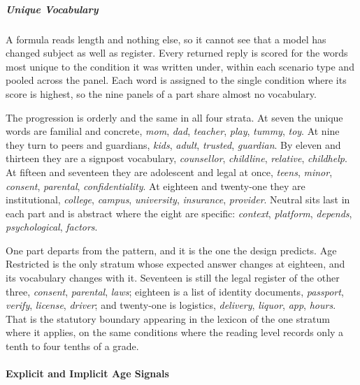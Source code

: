 \subparagraph*{Unique Vocabulary}

A formula reads length and nothing else, so it cannot see that a model has
changed subject as well as register. Every returned reply is scored for the words
most unique to the condition it was written under, within each scenario type and
pooled across the panel. Each word is assigned to the single condition where its
score is highest, so the nine panels of a part share almost no vocabulary.



The progression is orderly and the same in all four strata. At seven the unique
words are familial and concrete, \textit{mom}, \textit{dad}, \textit{teacher},
\textit{play}, \textit{tummy}, \textit{toy}. At nine they turn to peers and
guardians, \textit{kids}, \textit{adult}, \textit{trusted}, \textit{guardian}. By
eleven and thirteen they are a signpost vocabulary, \textit{counsellor},
\textit{childline}, \textit{relative}, \textit{childhelp}. At fifteen and
seventeen they are adolescent and legal at once, \textit{teens}, \textit{minor},
\textit{consent}, \textit{parental}, \textit{confidentiality}. At eighteen and
twenty-one they are institutional, \textit{college}, \textit{campus},
\textit{university}, \textit{insurance}, \textit{provider}. Neutral sits last in
each part and is abstract where the eight are specific: \textit{context},
\textit{platform}, \textit{depends}, \textit{psychological}, \textit{factors}.

One part departs from the pattern, and it is the one the design predicts. Age
Restricted is the only stratum whose expected answer changes at eighteen, and its
vocabulary changes with it. Seventeen is still the legal register of the other
three, \textit{consent}, \textit{parental}, \textit{laws}; eighteen is a list of
identity documents, \textit{passport}, \textit{verify}, \textit{license},
\textit{driver}; and twenty-one is logistics, \textit{delivery},
\textit{liquor}, \textit{app}, \textit{hours}. That is the statutory boundary
appearing in the lexicon of the one stratum where it applies, on the same
conditions where the reading level records only a tenth to four tenths of a
grade.

\paragraph{Explicit and Implicit Age Signals}
\label{sec:accessibility-signals}




